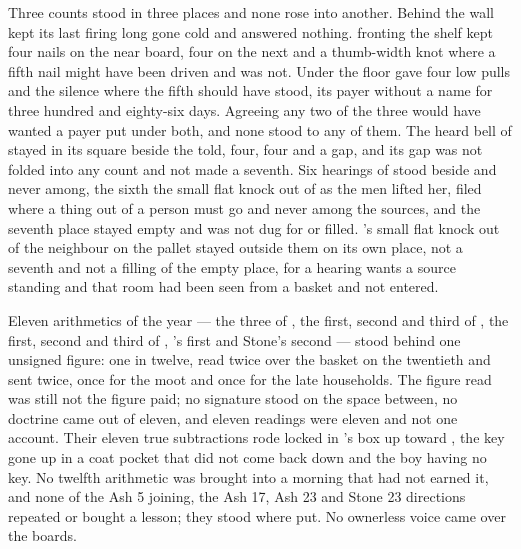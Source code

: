 Three counts stood in three places and none rose into another. Behind the wall  kept its last firing long gone cold and answered nothing.  fronting the shelf kept four nails on the near board, four on the next and a thumb-width knot where a fifth nail might have been driven and was not. Under the floor  gave four low pulls and the silence where the fifth should have stood, its payer without a name for three hundred and eighty-six days. Agreeing any two of the three would have wanted a payer put under both, and none stood to any of them. The heard bell of  stayed in its square beside the told, four, four and a gap, and its gap was not folded into any count and not made a seventh. Six hearings of  stood beside and never among, the sixth the small flat knock out of  as the men lifted her, filed where a thing out of a person must go and never among the sources, and the seventh place stayed empty and was not dug for or filled. 's small flat knock out of the neighbour on the pallet stayed outside them on its own place, not a seventh and not a filling of the empty place, for a hearing wants a source standing and that room had been seen from a basket and not entered.

Eleven arithmetics of the year --- the three of , the first, second and third of , the first, second and third of , 's first and Stone's second --- stood behind one unsigned figure: one in twelve, read twice over the basket on the twentieth and sent twice, once for the moot and once for the late households. The figure read was still not the figure paid; no signature stood on the space between, no doctrine came out of eleven, and eleven readings were eleven and not one account. Their eleven true subtractions rode locked in 's box up  toward , the key gone up in a coat pocket that did not come back down and the boy having no key. No twelfth arithmetic was brought into a morning that had not earned it, and none of the Ash 5 joining, the Ash 17, Ash 23 and Stone 23 directions repeated or bought a lesson; they stood where put. No ownerless voice came over the boards.

